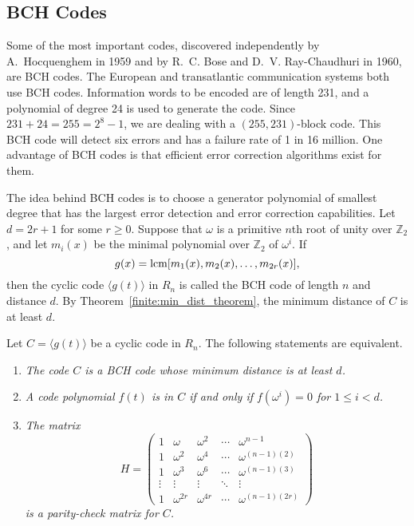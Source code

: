 \subsection*{BCH Codes}
 
Some of the most important codes,
discovered independently by A.~Hocquenghem in 1959 and by R.~C. Bose and D.~V. Ray-Chaudhuri in 1960, are BCH codes.  The European and transatlantic  communication systems both use BCH codes.  Information words to be
encoded are of length 231, and a polynomial of degree 24 is used to
generate the code.  Since $231 + 24 = 255 = 2^8-1$, we are dealing
with a \mbox{$(255, 231)$-block} code. This BCH code will detect six
errors and has a failure rate of 1 in 16 million. One advantage of BCH
codes is that efficient error correction algorithms exist for them. 


The idea behind BCH codes is to choose a generator polynomial of
smallest degree that has the largest error detection and error
correction 
capabilities. Let $d = 2r + 1$ for some $r \geq 0$.  Suppose that
$\omega$ is a primitive $n$th root of unity over ${\mathbb Z}_2$, and
let $m_i(x)$ be the minimal polynomial over ${\mathbb Z}_2$ of
$\omega^i$. If  
\[
g(x) = \operatorname{lcm}[ m_1(x), m_{2}(x), \ldots, m_{2r}(x)],
\]
then the cyclic code $\langle g(t) \rangle$ in $R_n$ is called the
{\bfi BCH code of length} $n$ {\bfi and distance} $d$.
By Theorem~\ref{finite:min_dist_theorem}, the minimum distance of $C$ is at least $d$. 


\begin{theorem}
Let $C = \langle g(t) \rangle$ be a cyclic code in $R_n$. The
following statements are equivalent. 
\begin{enumerate}

\rm\item\it
The code $C$ is a BCH code whose minimum distance is at least $d$.


\rm\item\it
A code polynomial $f(t)$ is in $C$ if and only if $f( \omega^i) = 0$
for $1 \leq i < d$. 

\rm\item\it
The matrix 
\[
H
=
\begin{pmatrix}
1      & \omega      & \omega^2    & \cdots & \omega^{n-1}\\
1      & \omega^2    & \omega^{4}  & \cdots & \omega^{(n-1)(2)} \\
1      & \omega^3    & \omega^{6}  & \cdots & \omega^{(n-1)(3)} \\
\vdots & \vdots      & \vdots      & \ddots & \vdots \\
1      & \omega^{2r} & \omega^{4r} & \cdots & \omega^{(n-1)(2r)} 
\end{pmatrix}
\]
is a parity-check matrix for $C$.

\end{enumerate}
\end{theorem}


